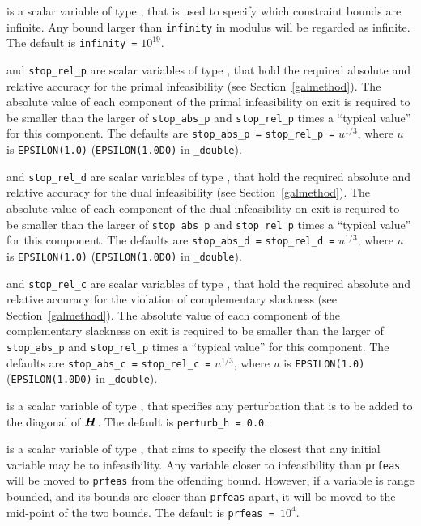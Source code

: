 \begin{description}
 is a scalar variable of type \realdp, that is used to
specify which constraint bounds are infinite.
Any bound larger than {\tt infinity} in modulus will be regarded as infinite.
The default is {\tt infinity =} $10^{19}$.

 and {\tt stop\_rel\_p}
are scalar variables of type \realdp, that hold the
required absolute and relative accuracy for the primal infeasibility
(see Section~\ref{galmethod}).
The absolute value of each component of the primal infeasibility
on exit is required to be smaller than the larger of {\tt stop\_abs\_p} and
{\tt stop\_rel\_p} times a ``typical value'' for this component.
The defaults are {\tt stop\_abs\_p =} {\tt stop\_rel\_p =} $u^{1/3}$,
where $u$ is {\tt EPSILON(1.0)} ({\tt EPSILON(1.0D0)} in
{\tt \fullpackagename\_double}).

 and {\tt stop\_rel\_d}
are scalar variables of type \realdp, that hold the
required absolute and relative accuracy for the dual infeasibility
(see Section~\ref{galmethod}).
The absolute value of each component of the dual infeasibility
on exit is required to be smaller than the larger of {\tt stop\_abs\_p} and
{\tt stop\_rel\_p} times a ``typical value'' for this component.
The defaults are {\tt stop\_abs\_d =} {\tt stop\_rel\_d =} $u^{1/3}$,
where $u$ is {\tt EPSILON(1.0)} ({\tt EPSILON(1.0D0)} in
{\tt \fullpackagename\_double}).

 and {\tt stop\_rel\_c}
are scalar variables of type \realdp, that hold the
required absolute and relative accuracy
for the violation of complementary slackness
(see Section~\ref{galmethod}).
The absolute value of each component of the complementary slackness
on exit is required to be smaller than the larger of {\tt stop\_abs\_p} and
{\tt stop\_rel\_p} times a ``typical value'' for this component.
The defaults are {\tt stop\_abs\_c =} {\tt stop\_rel\_c =} $u^{1/3}$,
where $u$ is {\tt EPSILON(1.0)} ({\tt EPSILON(1.0D0)} in
{\tt \fullpackagename\_double}).

 is a scalar variable of type \realdp, that specifies
any perturbation that is to be added to the diagonal of ${\bm{H}}$.
The default is {\tt perturb\_h = 0.0}.

 is a scalar variable of type \realdp, that aims to specify
the closest that any initial variable may be to infeasibility. Any variable
closer to infeasibility than {\tt prfeas} will be moved to {\tt prfeas} from
the offending bound. However, if a variable is range bounded, and its bounds
are closer than {\tt prfeas} apart, it will be moved to the mid-point of the
two bounds.
The default is {\tt prfeas = $10^4$}.


\end{description}
